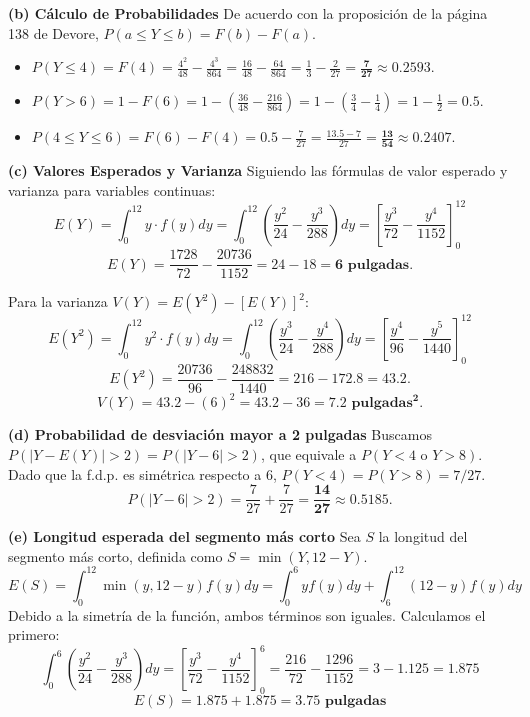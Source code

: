 \documentclass[a4paper]{article}
\begin{document}
\textbf{(b) Cálculo de Probabilidades}
De acuerdo con la proposición de la página 138 de Devore, $P(a \le Y \le b) = F(b) - F(a)$.

\begin{itemize}
    \item $P(Y \le 4) = F(4) = \frac{4^2}{48} - \frac{4^3}{864} = \frac{16}{48} - \frac{64}{864} = \frac{1}{3} - \frac{2}{27} = \mathbf{\frac{7}{27} \approx 0.2593}$.
    \item $P(Y > 6) = 1 - F(6) = 1 - \left( \frac{36}{48} - \frac{216}{864} \right) = 1 - \left( \frac{3}{4} - \frac{1}{4} \right) = 1 - \frac{1}{2} = \mathbf{0.5}$.
    \item $P(4 \le Y \le 6) = F(6) - F(4) = 0.5 - \frac{7}{27} = \frac{13.5 - 7}{27} = \mathbf{\frac{13}{54} \approx 0.2407}$.
\end{itemize}

\textbf{(c) Valores Esperados y Varianza}
Siguiendo las fórmulas de valor esperado y varianza para variables continuas:
$$E(Y) = \int_{0}^{12} y \cdot f(y) dy = \int_{0}^{12} \left( \frac{y^2}{24} - \frac{y^3}{288} \right) dy = \left[ \frac{y^3}{72} - \frac{y^4}{1152} \right]_{0}^{12}$$
$$E(Y) = \frac{1728}{72} - \frac{20736}{1152} = 24 - 18 = \mathbf{6 \text{ pulgadas}}.$$

Para la varianza $V(Y) = E(Y^2) - [E(Y)]^2$:
$$E(Y^2) = \int_{0}^{12} y^2 \cdot f(y) dy = \int_{0}^{12} \left( \frac{y^3}{24} - \frac{y^4}{288} \right) dy = \left[ \frac{y^4}{96} - \frac{y^5}{1440} \right]_{0}^{12}$$
$$E(Y^2) = \frac{20736}{96} - \frac{248832}{1440} = 216 - 172.8 = \mathbf{43.2}.$$
$$V(Y) = 43.2 - (6)^2 = 43.2 - 36 = \mathbf{7.2 \text{ pulgadas}^2}.$$

\textbf{(d) Probabilidad de desviación mayor a 2 pulgadas}
Buscamos $P(|Y - E(Y)| > 2) = P(|Y - 6| > 2)$, que equivale a $P(Y < 4 \text{ o } Y > 8)$.
Dado que la f.d.p. es simétrica respecto a 6, $P(Y < 4) = P(Y > 8) = 7/27$.
$$P(|Y - 6| > 2) = \frac{7}{27} + \frac{7}{27} = \mathbf{\frac{14}{27} \approx 0.5185}.$$

\textbf{(e) Longitud esperada del segmento más corto}
Sea $S$ la longitud del segmento más corto, definida como $S = \min(Y, 12 - Y)$.
$$E(S) = \int_{0}^{12} \min(y, 12 - y) f(y) dy = \int_{0}^{6} y f(y) dy + \int_{6}^{12} (12 - y) f(y) dy$$
Debido a la simetría de la función, ambos términos son iguales. Calculamos el primero:
$$\int_{0}^{6} \left( \frac{y^2}{24} - \frac{y^3}{288} \right) dy = \left[ \frac{y^3}{72} - \frac{y^4}{1152} \right]_{0}^{6} = \frac{216}{72} - \frac{1296}{1152} = 3 - 1.125 = 1.875$$
$$E(S) = 1.875 + 1.875 = \mathbf{3.75 \text{ pulgadas}}$$
\end{document}
